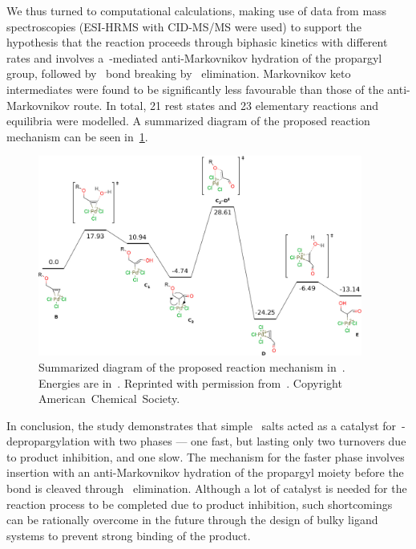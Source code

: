 We thus turned to computational calculations,
making use of data from mass spectroscopies (ESI-HRMS with CID-MS/MS were used) to support the hypothesis
that the reaction proceeds through biphasic kinetics with different rates
and
involves a~-mediated anti-Markovnikov hydration of the propargyl group,
followed by~ bond breaking by~ elimination.
Markovnikov keto intermediates were found to be significantly less favourable than those of the anti-Markovnikov route.
In total,
21 rest states and 23 elementary reactions and equilibria were modelled.
A summarized diagram of the proposed reaction mechanism can be seen in~\cref{fig:paper1-reaction}.
%
\begin{figure}[hbtp]
	\centering
	\includegraphics[width=0.95\textwidth]{slides/public/paper1-reaction}
	\caption{Summarized diagram of the proposed reaction mechanism in~\citeauthor{Coelho_2019}.
		Energies are in~\kcalmol.
		Reprinted with permission from~.
		Copyright~\citeyear{Coelho_2019}
		American~Chemical~Society.}\label{fig:paper1-reaction}
\end{figure}

In conclusion,
the study demonstrates that
simple~ salts acted as a catalyst for~-depropargylation with two phases --- one fast,
but lasting only two turnovers due to product inhibition,
and one slow.
The mechanism for the faster phase involves~ insertion
with an anti-Markovnikov hydration of the propargyl moiety before the~ bond is cleaved
through~ elimination.
Although a lot of catalyst is needed for the reaction process to be completed due to product inhibition,
such shortcomings can be rationally overcome in the future
through the design of bulky ligand systems
to prevent strong binding of the product.

